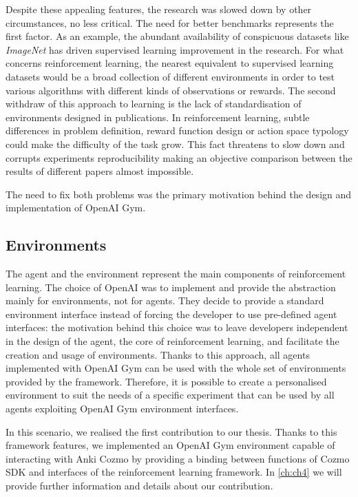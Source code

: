 Despite these appealing features, the research was slowed down by other circumstances, no less critical.
The need for better benchmarks represents the first factor.
As an example, the abundant availability of conspicuous datasets like \textit{ImageNet} \cite{deng2009imagenet} has driven supervised learning improvement in the research.
For what concerns reinforcement learning, the nearest equivalent to supervised learning datasets would be a broad collection of different environments in order to test various algorithms with different kinds of observations or rewards.
The second withdraw of this approach to learning is the lack of standardisation of environments designed in publications.
In reinforcement learning, subtle differences in problem definition, reward function design or action space typology could make the difficulty of the task grow.
This fact threatens to slow down and corrupts experiments reproducibility making an objective comparison between the results of different papers almost impossible.

The need to fix both problems was the primary motivation behind the design and implementation of OpenAI Gym.

\subsection{Environments}

The agent and the environment represent the main components of reinforcement learning.
The choice of OpenAI was to implement and provide the abstraction mainly for environments, not for agents.
They decide to provide a standard environment interface instead of forcing the developer to use pre-defined agent interfaces: the motivation behind this choice was to leave developers independent in the design of the agent, the core of reinforcement learning, and facilitate the creation and usage of environments.
Thanks to this approach, all agents implemented with OpenAI Gym can be used with the whole set of environments provided by the framework.
Therefore, it is possible to create a personalised environment to suit the needs of a specific experiment that can be used by all agents exploiting OpenAI Gym environment interfaces.

In this scenario, we realised the first contribution to our thesis.
Thanks to this framework features, we implemented an OpenAI Gym environment capable of interacting with Anki Cozmo by providing a binding between functions of Cozmo SDK and interfaces of the reinforcement learning framework.
In \vref{ch:ch4} we will provide further information and details about our contribution.


